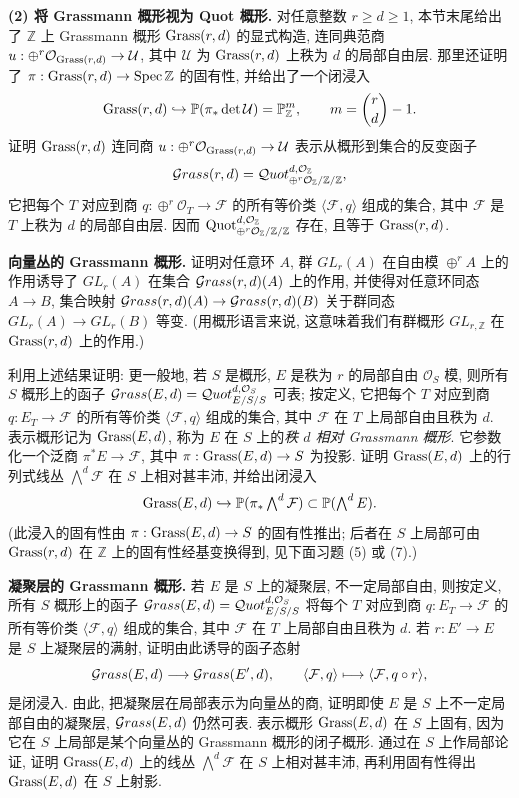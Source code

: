 \textbf{(2) 将 Grassmann 概形视为 Quot 概形.}
对任意整数 $r\geq d\geq1$, 本节末尾给出了 $\mathbb Z$ 上 Grassmann 概形 $\operatorname{Grass}(r,d)$ 的显式构造, 连同典范商 $u:\oplus^r\mathcal O_{\operatorname{Grass}(r,d)}\to\mathcal U$, 其中 $\mathcal U$ 为 $\operatorname{Grass}(r,d)$ 上秩为 $d$ 的局部自由层. 那里还证明了 $\pi:\operatorname{Grass}(r,d)\to\operatorname{Spec}\mathbb Z$ 的固有性, 并给出了一个闭浸入
\[
 \operatorname{Grass}(r,d)\hookrightarrow\mathbb P(\pi_*\det\mathcal U)=\mathbb P^m_{\mathbb Z},\qquad m=\binom rd-1.
\]
证明 $\operatorname{Grass}(r,d)$ 连同商 $u:\oplus^r\mathcal O_{\operatorname{Grass}(r,d)}\to\mathcal U$ 表示从概形到集合的反变函子
\[
 \mathcal{G}rass(r,d)=\mathcal{Q}uot^{d,\mathcal O_{\mathbb Z}}_{\oplus^r\mathcal O_{\mathbb Z}/\mathbb Z/\mathbb Z},
\]
它把每个 $T$ 对应到商 $q:\oplus^r\mathcal O_T\to\mathcal F$ 的所有等价类 $\langle\mathcal F,q\rangle$ 组成的集合, 其中 $\mathcal F$ 是 $T$ 上秩为 $d$ 的局部自由层. 因而 $\operatorname{Quot}^{d,\mathcal O_{\mathbb Z}}_{\oplus^r\mathcal O_{\mathbb Z}/\mathbb Z/\mathbb Z}$ 存在, 且等于 $\operatorname{Grass}(r,d)$.

\textbf{向量丛的 Grassmann 概形.}
证明对任意环 $A$, 群 $GL_r(A)$ 在自由模 $\oplus^r A$ 上的作用诱导了 $GL_r(A)$ 在集合 $\mathcal{G}rass(r,d)(A)$ 上的作用, 并使得对任意环同态 $A\to B$, 集合映射 $\mathcal{G}rass(r,d)(A)\to\mathcal{G}rass(r,d)(B)$ 关于群同态 $GL_r(A)\to GL_r(B)$ 等变.
(用概形语言来说, 这意味着我们有群概形 $GL_{r,\mathbb Z}$ 在 $\operatorname{Grass}(r,d)$ 上的作用.)

利用上述结果证明: 更一般地, 若 $S$ 是概形, $E$ 是秩为 $r$ 的局部自由 $\mathcal O_S$ 模, 则所有 $S$ 概形上的函子 $\mathcal{G}rass(E,d)=\mathcal{Q}uot^{d,\mathcal O_S}_{E/S/S}$ 可表; 按定义, 它把每个 $T$ 对应到商 $q:E_T\to\mathcal F$ 的所有等价类 $\langle\mathcal F,q\rangle$ 组成的集合, 其中 $\mathcal F$ 在 $T$ 上局部自由且秩为 $d$. 表示概形记为 $\operatorname{Grass}(E,d)$, 称为 $E$ 在 $S$ 上的\emph{秩 $d$ 相对 Grassmann 概形}. 它参数化一个泛商 $\pi^*E\to\mathcal F$, 其中 $\pi:\operatorname{Grass}(E,d)\to S$ 为投影. 证明 $\operatorname{Grass}(E,d)$ 上的行列式线丛 $\bigwedge^d\mathcal F$ 在 $S$ 上相对甚丰沛, 并给出闭浸入
\[
 \operatorname{Grass}(E,d)\hookrightarrow\mathbb P(\pi_*\textstyle\bigwedge^d\mathcal F)\subset\mathbb P(\textstyle\bigwedge^d E).
\]
(此浸入的固有性由 $\pi:\operatorname{Grass}(E,d)\to S$ 的固有性推出; 后者在 $S$ 上局部可由 $\operatorname{Grass}(r,d)$ 在 $\mathbb Z$ 上的固有性经基变换得到, 见下面习题 (5) 或 (7).)

\textbf{凝聚层的 Grassmann 概形.}
若 $E$ 是 $S$ 上的凝聚层, 不一定局部自由, 则按定义, 所有 $S$ 概形上的函子 $\mathcal{G}rass(E,d)=\mathcal{Q}uot^{d,\mathcal O_S}_{E/S/S}$ 将每个 $T$ 对应到商 $q:E_T\to\mathcal F$ 的所有等价类 $\langle\mathcal F,q\rangle$ 组成的集合, 其中 $\mathcal F$ 在 $T$ 上局部自由且秩为 $d$. 若 $r:E'\to E$ 是 $S$ 上凝聚层的满射, 证明由此诱导的函子态射
\[
 \mathcal{G}rass(E,d)\longrightarrow\mathcal{G}rass(E',d),\qquad
 \langle\mathcal F,q\rangle\longmapsto\langle\mathcal F,q\circ r\rangle,
\]
是闭浸入. 由此, 把凝聚层在局部表示为向量丛的商, 证明即使 $E$ 是 $S$ 上不一定局部自由的凝聚层, $\mathcal{G}rass(E,d)$ 仍然可表. 表示概形 $\operatorname{Grass}(E,d)$ 在 $S$ 上固有, 因为它在 $S$ 上局部是某个向量丛的 Grassmann 概形的闭子概形. 通过在 $S$ 上作局部论证, 证明 $\operatorname{Grass}(E,d)$ 上的线丛 $\bigwedge^d\mathcal F$ 在 $S$ 上相对甚丰沛, 再利用固有性得出 $\operatorname{Grass}(E,d)$ 在 $S$ 上射影.

